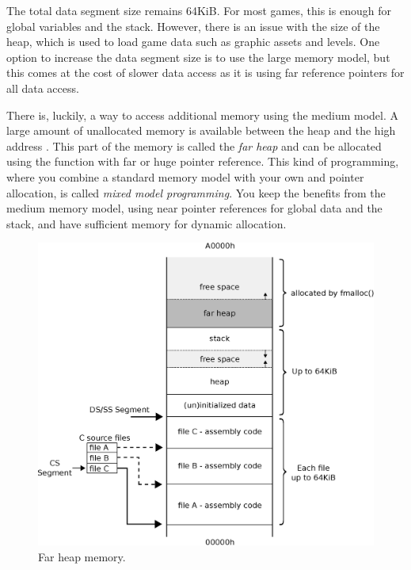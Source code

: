 \documentclass[book.tex]{subfiles}
\begin{document}
\par
The total data segment size remains 64KiB. For most games, this is enough for global variables and the stack. However, there is an issue with the size of the heap, which is used to load game data such as graphic assets and levels. One option to increase the data segment size is to use the large memory model, but this comes at the cost of slower data access as it is using far reference pointers for all data access.\\

\par
There is, luckily, a way to access additional memory using the medium model. A large amount of unallocated memory is available between the heap and the high address . This part of the memory is called the \textit{far heap} and can be allocated using the  function with far or huge pointer reference. This kind of programming, where you combine a standard memory model with your own  and  pointer allocation, is called \textit{mixed model programming}. You keep the benefits from the medium memory model, using near pointer references for global data and the stack, and have sufficient memory for dynamic allocation.\\

\begin{figure}[H]
\centering
\includegraphics[width=1.0\textwidth]{imgs/drawings/memory/farheap_medium_model.eps}
\caption{Far heap memory.}
\label{fig:mm_farheap}
\end{figure}
\par
\end{document}
